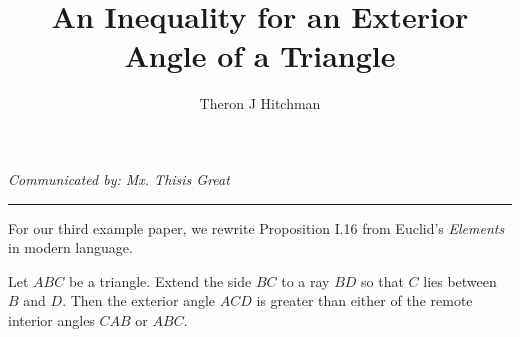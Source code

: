 \documentclass[12pt]{article}
\newenvironment{theorem}[1][Theorem]{\begin{trivlist}
\item[\hskip \labelsep {\bfseries #1}]}{\end{trivlist}}
\begin{document}
 
 
\title{An Inequality for an Exterior Angle of a Triangle} %
\author{Theron J Hitchman} %
 
\maketitle

{%
\centering
\textit{Communicated by: Mx. Thisis Great} %
\par
}
\hrule
\vspace{.2in}


For our third example paper, we rewrite Proposition I.16 from Euclid's \emph{Elements} in modern language.

\begin{theorem}[Euclid's Proposition I.16] Let $ABC$ be a triangle. Extend the side $BC$ to a ray $BD$ so that $C$ lies between $B$ and $D$. Then the exterior angle $ACD$ is greater than either of the remote interior angles $CAB$ or $ABC$.
\end{theorem}
 
\end{document}
